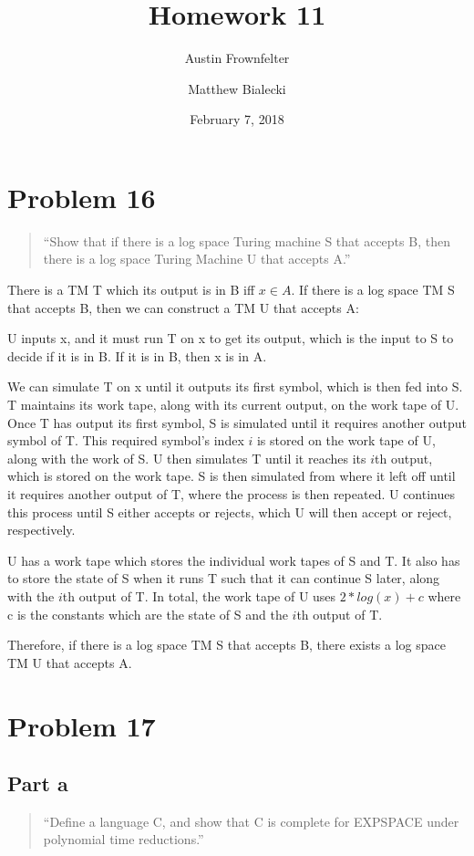 \documentclass{article}
\title{Homework 11}
\author{Austin Frownfelter \and Matthew Bialecki}
\date{February 7, 2018}
\begin{document}
\maketitle

\section{Problem 16}
\begin{quote}
``Show that if there is a log space Turing machine S that accepts B, then there is a log space Turing Machine U that accepts A.''
\end{quote}

There is a TM T which its output is in B iff $x \in A$.  If there is a log space TM S that accepts B, then we can construct a TM U that accepts A:

\bigskip
U inputs x, and it must run T on x to get its output, which is the input to S to decide if it is in B.  If it is in B, then x is in A.

We can simulate T on x until it outputs its first symbol, which is then fed into S.  T maintains its work tape, along with its current output, on the work tape of U.  Once T has output its first symbol, S is simulated until it requires another output symbol of T.  This required symbol's index $i$ is stored on the work tape of U, along with the work of S.  U then simulates T until it reaches its $i$th output, which is stored on the work tape.  S is then simulated from where it left off until it requires another output of T, where the process is then repeated.  U continues this process until S either accepts or rejects, which U will then accept or reject, respectively.  

U has a work tape which stores the individual work tapes of S and T.  It also has to store the state of S when it runs T such that it can continue S later, along with the $i$th output of T.  In total, the work tape of U uses $2*log(x)+c$ where c is the constants which are the state of S and the $i$th output of T.

Therefore, if there is a log space TM S that accepts B, there exists a log space TM U that accepts A.

\section{Problem 17}
\subsection{Part a}
\begin{quote}
``Define a language C, and show that C is complete for EXPSPACE under polynomial time reductions.''
\end{quote}
\end{document}
